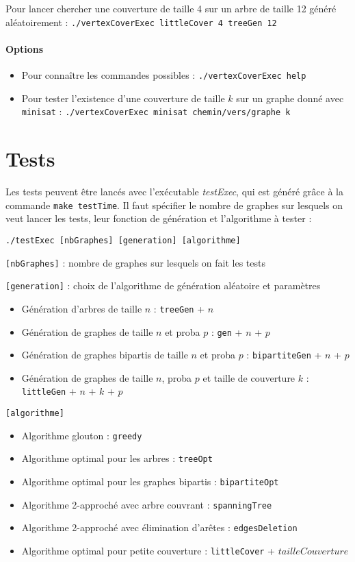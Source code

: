 \documentclass[a4paper,10pt]{article}
\newcommand*{\itemb}{\item[$\bullet$]}
\begin{document}
	Pour lancer chercher une couverture de taille 4 sur un arbre de taille 12 généré aléatoirement :
	\texttt{./vertexCoverExec littleCover 4 treeGen 12}
	
	\paragraph{Options}
	\begin{itemize}
	\item Pour connaître les commandes possibles : \texttt{./vertexCoverExec help}
	\item Pour tester l'existence d'une couverture de taille $k$ sur un graphe donné avec \texttt{minisat} : \texttt{./vertexCoverExec minisat chemin/vers/graphe k}
	\end{itemize}

\section{Tests}
	Les tests peuvent être lancés avec l'exécutable \textit{testExec}, qui est généré grâce à la commande \texttt{make testTime}. Il faut spécifier le nombre de graphes sur lesquels on veut lancer les tests, leur fonction de génération et l'algorithme à tester :
	
	\bigskip
	\texttt{./testExec [nbGraphes] [generation] [algorithme]}
	
	\bigskip
	\texttt{[nbGraphes]} : nombre de graphes sur lesquels on fait les tests
	
	\bigskip
	\texttt{[generation]} : choix de l'algorithme de génération aléatoire et paramètres 
	\begin{itemize}
			\itemb Génération d'arbres de taille $n$ : \texttt{treeGen} + $n$
			\itemb Génération de graphes de taille $n$ et proba $p$ : \texttt{gen} + $n$ + $p$
			\itemb Génération de graphes bipartis de taille $n$ et proba $p$ : \texttt{bipartiteGen} + $n$ + $p$
			\itemb Génération de graphes de taille $n$, proba $p$ et taille de couverture $k$ : \texttt{littleGen} + $n$ + $k$ + $p$
	\end{itemize}
	
	\bigskip
	\texttt{[algorithme]}
	\begin{itemize}
		\item Algorithme glouton : \texttt{greedy}
		\item Algorithme optimal pour les arbres : \texttt{treeOpt}
		\item Algorithme optimal pour les graphes bipartis : \texttt{bipartiteOpt}
		\item Algorithme 2-approché avec arbre couvrant : \texttt{spanningTree}
		\item Algorithme 2-approché avec élimination d'arêtes : \texttt{edgesDeletion}
		\item Algorithme optimal pour petite couverture : \texttt{littleCover} + $tailleCouverture$
	\end{itemize}
	
\end{document}
